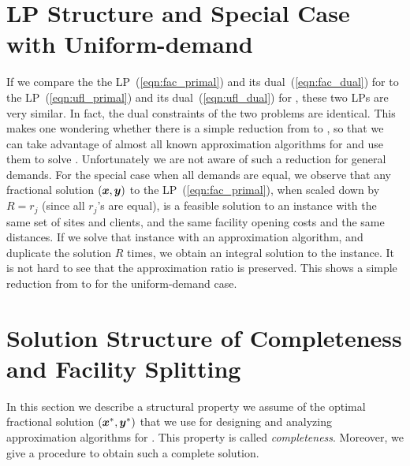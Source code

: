 \documentclass[oneside,final]{ucr}
\begin{document}

\section{LP Structure and Special Case with Uniform-demand}
\label{sec:ftfp_uniform_demand}

If we compare the the LP~(\ref{eqn:fac_primal}) and its
dual~(\ref{eqn:fac_dual}) for {\FTFP} to the
LP~(\ref{eqn:ufl_primal}) and its dual~(\ref{eqn:ufl_dual})
for {\UFL}, these two LPs are very similar. In fact, the
dual constraints of the two problems are identical. This
makes one wondering whether there is a simple reduction from
{\FTFP} to {\UFL}, so that we can take advantage of almost
all known approximation algorithms for {\UFL} and use them
to solve {\FTFP}. Unfortunately we are not aware of such a
reduction for general demands. For the special case when all
demands are equal, we observe that any fractional solution
$(\boldsymbol{x},\boldsymbol{y})$ to the LP~(\ref{eqn:fac_primal}), when scaled
down by $R = r_j$ (since all $r_j$'s are equal), is a
feasible solution to an {\UFL} instance with the same set of
sites and clients, and the same facility opening costs and
the same distances. If we solve that {\UFL} instance with an
approximation algorithm, and duplicate the solution $R$
times, we obtain an integral solution to the {\FTFP}
instance. It is not hard to see that the approximation ratio
is preserved. This shows a simple reduction from {\FTFP} to
{\UFL} for the uniform-demand case.

\section{Solution Structure of Completeness and Facility  Splitting}
\label{sec:ftfp_complete}
In this section we describe a structural property we assume
of the optimal fractional solution $(\boldsymbol{x}^\ast, \boldsymbol{y}^\ast)$
that we use for designing and analyzing approximation
algorithms for {\FTFP}. This property is called
\emph{completeness}. Moreover, we give a procedure to obtain
such a complete solution.
\end{document}

